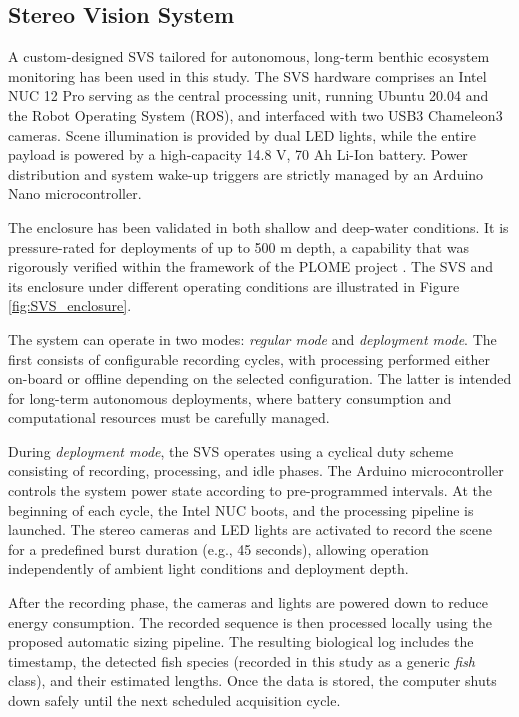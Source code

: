 \documentclass[utf8]{FrontiersinHarvard} %
\begin{document}
\subsection{Stereo Vision System}\label{sec::SVS}

A custom-designed SVS tailored for autonomous, long-term benthic ecosystem monitoring has been used in this study. The SVS hardware comprises an Intel NUC 12 Pro serving as the central processing unit, running Ubuntu 20.04 and the Robot Operating System (ROS), and interfaced with two USB3 Chameleon3 cameras. Scene illumination is provided by dual LED lights, while the entire payload is powered by a high-capacity 14.8 V, 70 Ah Li-Ion battery. Power distribution and system wake-up triggers are strictly managed by an Arduino Nano microcontroller. 

The enclosure has been validated in both shallow and deep-water conditions. It is pressure-rated for deployments of up to 500 m depth, a capability that was rigorously verified within the framework of the PLOME project \citep{PLOME_project}. The SVS and its enclosure under different operating conditions are illustrated in Figure \ref{fig:SVS_enclosure}.

The system can operate in two modes: \textit{regular mode} and \textit{deployment mode}. The first consists of configurable recording cycles, with processing performed either on-board or offline depending on the selected configuration. The latter is intended for long-term autonomous deployments, where battery consumption and computational resources must be carefully managed.

During \textit{deployment mode}, the SVS operates using a cyclical duty scheme consisting of recording, processing, and idle phases. The Arduino microcontroller controls the system power state according to pre-programmed intervals. At the beginning of each cycle, the Intel NUC boots, and the processing pipeline is launched. The stereo cameras and LED lights are activated to record the scene for a predefined burst duration (e.g., 45 seconds), allowing operation independently of ambient light conditions and deployment depth.


After the recording phase, the cameras and lights are powered down to reduce energy consumption. The recorded sequence is then processed locally using the proposed automatic sizing pipeline. The resulting biological log includes the timestamp, the detected fish species (recorded in this study as a generic \textit{fish} class), and their estimated lengths. Once the data is stored, the computer shuts down safely until the next scheduled acquisition cycle.
\end{document}
